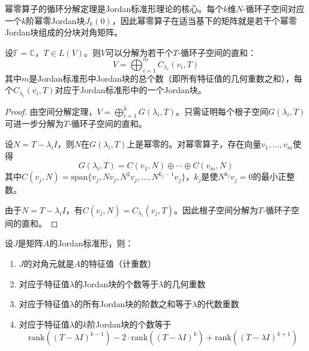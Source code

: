 幂零算子的循环分解定理是Jordan标准形理论的核心。每个$k$维$N$-循环子空间对应一个$k$阶幂零Jordan块$J_k(0)$，因此幂零算子在适当基下的矩阵就是若干个幂零Jordan块组成的分块对角矩阵。

\begin{theorem}[循环子空间分解]
设$\mathbb{F} = \mathbb{C}$，$T \in L(V)$。则$V$可以分解为若干个$T$-循环子空间的直和：
\[
V = \bigoplus_{i=1}^m C_{\lambda_i}(v_i, T)
\]
其中$m$是Jordan标准形中Jordan块的总个数（即所有特征值的几何重数之和），每个$C_{\lambda_i}(v_i, T)$对应于Jordan标准形中的一个Jordan块。
\end{theorem}

\begin{proof}
由空间分解定理，$V = \bigoplus_{i=1}^k G(\lambda_i, T)$。只需证明每个根子空间$G(\lambda_i, T)$可进一步分解为$T$-循环子空间的直和。

设$N = T - \lambda_i I$，则$N$在$G(\lambda_i, T)$上是幂零的。对幂零算子，存在向量$v_1, \ldots, v_m$使得
\[
G(\lambda_i, T) = C(v_1, N) \oplus \cdots \oplus C(v_m, N)
\]
其中$C(v_j, N) = \text{span}\{v_j, Nv_j, N^2v_j, \ldots, N^{k_j-1}v_j\}$，$k_j$是使$N^{k_j}v_j = 0$的最小正整数。

由于$N = T - \lambda_i I$，有$C(v_j, N) = C_{\lambda_i}(v_j, T)$。因此根子空间分解为$T$-循环子空间的直和。
\end{proof}

\begin{proposition}
设$J$是矩阵$A$的Jordan标准形，则：
\begin{enumerate}
    \item $J$的对角元就是$A$的特征值（计重数）
    \item 对应于特征值$\lambda$的Jordan块的个数等于$\lambda$的几何重数
    \item 对应于特征值$\lambda$的所有Jordan块的阶数之和等于$\lambda$的代数重数
    \item 对应于特征值$\lambda$的$k$阶Jordan块的个数等于
    $$\mathrm{rank}((T-\lambda I)^{k-1}) - 2\cdot\mathrm{rank}((T-\lambda I)^k) + \mathrm{rank}((T-\lambda I)^{k+1})$$
\end{enumerate}
\end{proposition}

